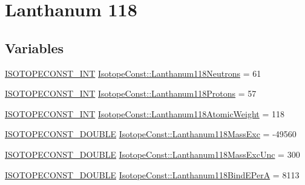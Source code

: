 \hypertarget{group___isotope_const-_lanthanum-_la118}{}\section{Lanthanum 118}
\label{group___isotope_const-_lanthanum-_la118}
\subsection*{Variables}
\begin{DoxyCompactItemize}
\item 
\mbox{\hyperlink{group___isotope_const-_macros_ga5f18360b3e99483a35c32d789e62621c}{I\+S\+O\+T\+O\+P\+E\+C\+O\+N\+S\+T\+\_\+\+I\+NT}} \mbox{\hyperlink{group___isotope_const-_lanthanum-_la118_gada9e32b4945f507fb6894013189b8543}{Isotope\+Const\+::\+Lanthanum118\+Neutrons}} = 61
\item 
\mbox{\hyperlink{group___isotope_const-_macros_ga5f18360b3e99483a35c32d789e62621c}{I\+S\+O\+T\+O\+P\+E\+C\+O\+N\+S\+T\+\_\+\+I\+NT}} \mbox{\hyperlink{group___isotope_const-_lanthanum-_la118_gae1fc52ac762890840006b7dee5bf5ca4}{Isotope\+Const\+::\+Lanthanum118\+Protons}} = 57
\item 
\mbox{\hyperlink{group___isotope_const-_macros_ga5f18360b3e99483a35c32d789e62621c}{I\+S\+O\+T\+O\+P\+E\+C\+O\+N\+S\+T\+\_\+\+I\+NT}} \mbox{\hyperlink{group___isotope_const-_lanthanum-_la118_ga492ccd0c6fdc8f6a08fa67329eb02585}{Isotope\+Const\+::\+Lanthanum118\+Atomic\+Weight}} = 118
\item 
\mbox{\hyperlink{group___isotope_const-_macros_ga8f45a7272ce02c0b4c65c44636ed719a}{I\+S\+O\+T\+O\+P\+E\+C\+O\+N\+S\+T\+\_\+\+D\+O\+U\+B\+LE}} \mbox{\hyperlink{group___isotope_const-_lanthanum-_la118_ga648ef2c3284093d61185930274c974f3}{Isotope\+Const\+::\+Lanthanum118\+Mass\+Exc}} = -\/49560
\item 
\mbox{\hyperlink{group___isotope_const-_macros_ga8f45a7272ce02c0b4c65c44636ed719a}{I\+S\+O\+T\+O\+P\+E\+C\+O\+N\+S\+T\+\_\+\+D\+O\+U\+B\+LE}} \mbox{\hyperlink{group___isotope_const-_lanthanum-_la118_ga24168903f8eff61d0080e5f918a61f63}{Isotope\+Const\+::\+Lanthanum118\+Mass\+Exc\+Unc}} = 300
\item 
\mbox{\hyperlink{group___isotope_const-_macros_ga8f45a7272ce02c0b4c65c44636ed719a}{I\+S\+O\+T\+O\+P\+E\+C\+O\+N\+S\+T\+\_\+\+D\+O\+U\+B\+LE}} \mbox{\hyperlink{group___isotope_const-_lanthanum-_la118_ga7b68395b0e461056b2f285a9fabc8328}{Isotope\+Const\+::\+Lanthanum118\+Bind\+E\+PerA}} = 8113
\item 

\end{DoxyCompactItemize}
